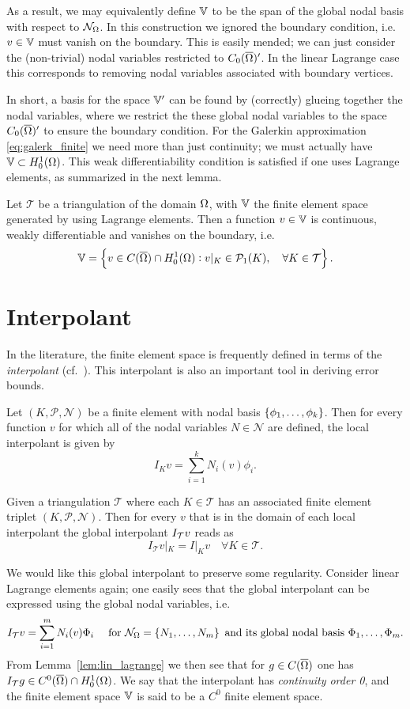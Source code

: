\documentclass[thesis.tex]{subfiles}
\begin{document}
  As a result, we may equivalently define $\mathbb{V}$ to be the span of the global nodal basis with respect to $\mathcal{N}_\Omega$.   
  In this construction  we ignored the boundary condition, i.e.~ $v \in \mathbb{V}$ must vanish on the boundary.
  This is easily mended; we can just consider the (non-trivial)
  nodal variables restricted to $C_0(\overline{\Omega})'$.  In the linear Lagrange case this corresponds to removing nodal variables associated with
   boundary vertices.  

   In short, a basis for the space $\mathbb{V}'$ can be found by (correctly) glueing together the nodal variables, where we restrict
  the these global nodal variables to the space $C_0(\overline{\Omega})'$ to ensure the boundary condition.
  For the Galerkin approximation \eqref{eq:galerk_finite} we need more than just continuity; we must actually have $\mathbb{V} \subset H^1_0(\Omega)$. This
  weak differentiability  condition is satisfied if one uses Lagrange elements, as summarized in the next lemma.
  \begin{lem}
    \label{lem:lin_lagrange}
    Let $\mathcal{T}$ be a triangulation of the domain $\Omega$, with $\mathbb{V}$ the finite element space generated
    by using Lagrange elements. Then a function $v \in \mathbb{V}$ is continuous, weakly differentiable and vanishes on the boundary, i.e.
    \[
      \mathbb{V} = \set{v \in C(\overline{\Omega}) \cap H_0^1(\Omega) : v|_{K} \in \mathcal{P}_1(K), \quad \forall K \in \mathcal{T}}.
    \]
  \end{lem}
\section{Interpolant}
\label{sec:apriori}
In the literature, the finite element space is frequently defined in terms of the \emph{interpolant} 
(cf.~\cite[Ch~3]{brenner}). This interpolant is also an important tool in deriving error bounds. 
  \begin{defn}
    Let $(K, \mathcal{P}, \mathcal{N})$ be a finite element with nodal basis $\set{\phi_1,\dots, \phi_k}$. Then for every function $v$ for which all of the nodal variables $N \in \mathcal{N}$ are defined, the local interpolant is given by
    \[
      I_K v = \sum_{i = 1}^k N_i(v)\phi_i.
    \]
  \end{defn}
  \begin{defn}
    Given a triangulation $\mathcal{T}$ where each $K \in \mathcal{T}$ has an associated 
    finite element triplet $(K, \mathcal{P}, \mathcal{N})$. Then for
    every $v$ that is in the domain of each local interpolant the global interpolant $I_{\mathcal{T}} v$ reads as
    \[
      I_{\mathcal{T}} v |_K = I|_K v \quad \forall K \in \mathcal{T}.
    \]
  \end{defn}
  We would like this global interpolant to preserve some regularity. Consider
  linear Lagrange elements again; one easily sees that the global interpolant can be expressed using the global nodal variables, i.e.
    \[
      I_{\mathcal{T}} v = \sum_{i=1}^m N_i(v)\Phi_i \quad \text{ for } \mathcal{N}_\Omega =\set{N_1, \dots, N_m} \text{ and its global nodal basis } \Phi_1,\dots,\Phi_m.
    \]
    From Lemma~\ref{lem:lin_lagrange} we then see that for $g \in C(\overline{\Omega})$ one has $I_{\mathcal{T}} g \in C^0(\overline{\Omega}) \cap H_0^1(\Omega)$. We say
    that the interpolant has \emph{continuity order 0}, and the finite element space $\mathbb{V}$ is said to be a $C^0$ finite element space.
\end{document}
